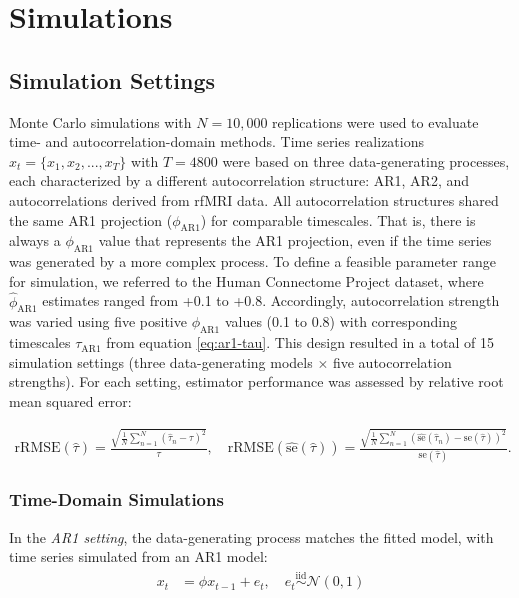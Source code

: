 \documentclass[latex/main.tex]{subfiles}
\begin{document}
\section{Simulations}\label{sec:simulations}

\subsection{Simulation Settings}
Monte Carlo simulations with $N = 10,000$ replications were used to evaluate time- and autocorrelation-domain methods. Time series realizations $x_t = \{x_1, x_2, ..., x_T\}$ with $T=4800$ were based on three data-generating processes, each characterized by a different autocorrelation structure: AR1, AR2, and autocorrelations derived from rfMRI data. All autocorrelation structures shared the same AR1 projection ($\phi_\text{AR1}$) for comparable timescales. That is, there is always a $\phi_\text{AR1}$ value that represents the AR1 projection, even if the time series was generated by a more complex process. To define a feasible parameter range for simulation, we referred to the Human Connectome Project dataset, where $\hat\phi_\text{AR1}$ estimates ranged from +0.1 to +0.8. Accordingly, autocorrelation strength was varied using five positive $\phi_\text{AR1}$ values (0.1 to 0.8) with corresponding timescales $\tau_\text{AR1}$ from equation \eqref{eq:ar1-tau}. This design resulted in a total of 15 simulation settings (three data-generating models $\times$ five autocorrelation strengths). For each setting, estimator performance was assessed by relative root mean squared error:

\begin{align}
    \text{rRMSE}(\hat\tau) = \frac{\sqrt{\frac{1}{N} \sum_{n=1}^N (\hat\tau_n - \tau)^2}}{\tau}, \quad \text{rRMSE}(\widehat{\text{se}}(\hat\tau)) = \frac{\sqrt{\frac{1}{N} \sum_{n=1}^N \left(\widehat{\text{se}}(\hat\tau_n) - \text{se}(\hat\tau)\right)^2}}{\text{se}(\hat\tau)}.
\end{align}

\subsubsection{Time-Domain Simulations}
In the \textit{AR1 setting}, the data-generating process matches the fitted model, with time series simulated from an AR1 model:
\begin{align}
    x_t &= \phi x_{t-1} + e_t, \quad e_t \overset{\text{iid}}{\sim} \mathcal{N}(0, 1)
\end{align}
\end{document}
